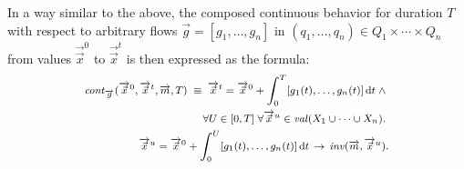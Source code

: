 In a way similar to the above,
the composed continuous behavior for duration $T$ 
with respect to arbitrary flows $\overrightarrow{g} = [g_1,\ldots,g_n]$ 
in $(q_1,\ldots,q_n) \in Q_1 \times \cdots \times Q_n$ 
from values $\overrightarrow{\vec{x}}^0$ to $\overrightarrow{\vec{x}}^t$
is then expressed as the formula:
\[
\begin{medsize}
\begin{aligned}
\mathit{cont}_{\overrightarrow{g}}(\overrightarrow{\vec{x}}^0, \overrightarrow{\vec{x}}^t,
\overrightarrow{m}, T)
\;\equiv\;
\overrightarrow{\vec{x}}^t
= 
\overrightarrow{\vec{x}}^0
+ 
\int_{0}^T 
[g_1(t),\ldots,g_n(t)]
\,\mathrm{d}t
\;\wedge\;
\\
\forall U \in [0,T]\;
\forall \overrightarrow{\vec{x}}^u \in \val(X_1 \cup \cdots \cup X_n).\;
\\
\overrightarrow{\vec{x}}^u
 = 
\overrightarrow{\vec{x}}^0
+ 
\int_{0}^U 
[g_1(t),\ldots,g_n(t)]
\,\mathrm{d}t 
\,\to\,
\mathit{inv}(\overrightarrow{m},\overrightarrow{\vec{x}}^u).
\end{aligned}
\end{medsize}
\]




